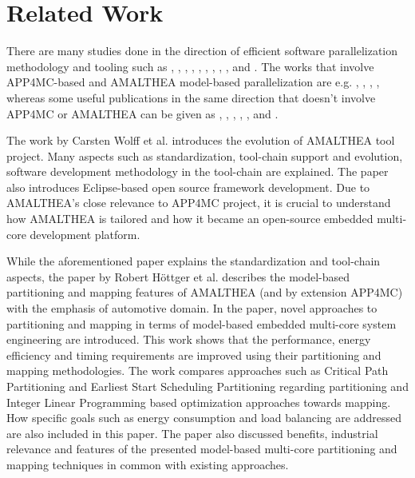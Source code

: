 

\section{Related Work}
There are many studies done in the direction of efficient software parallelization methodology and tooling such as \cite{toolchaintailoringapp4mc}, \cite{priorpaperapp4mc}, \cite{comparisonpaperapp4mc}, \cite{constrainedpaper}, \cite{autosarospaper1}, \cite{paper2}, \cite{paper3}, \cite{paper4}, \cite{paper5}, and \cite{paper6}.
The works that involve APP4MC-based and AMALTHEA model-based parallelization are e.g. \cite{toolchaintailoringapp4mc}, \cite{priorpaperapp4mc}, \cite{comparisonpaperapp4mc}, \cite{constrainedpaper}, whereas some useful publications in the same direction that doesn't involve APP4MC or AMALTHEA can be given as \cite{autosarospaper1}, \cite{paper2}, \cite{paper3}, \cite{paper4}, \cite{paper5}, and \cite{paper6}.

The work by Carsten Wolff et al. \cite{toolchaintailoringapp4mc} introduces the evolution of AMALTHEA tool project. Many aspects such as standardization, tool-chain support and evolution, software development methodology in the tool-chain are explained. The paper also introduces Eclipse-based open source framework development. Due to AMALTHEA's close relevance to APP4MC project, it is crucial to understand how AMALTHEA is tailored and how it became an open-source embedded multi-core development platform. 

While the aforementioned paper explains the standardization and tool-chain aspects, the paper by Robert H{\"o}ttger et al. \cite{priorpaperapp4mc} describes the model-based partitioning and mapping features of AMALTHEA (and by extension APP4MC) with the emphasis of automotive domain. In the paper, novel approaches to partitioning and mapping in terms of model-based embedded multi-core system engineering are introduced. This work shows that the performance, energy efficiency and timing requirements are improved using their partitioning and mapping methodologies. The work compares approaches such as Critical Path Partitioning and Earliest Start Scheduling Partitioning regarding partitioning and Integer Linear Programming based optimization approaches towards mapping. How specific goals such as energy consumption and load balancing are addressed are also included in this paper. The paper also discussed benefits, industrial relevance and features of the presented model-based multi-core partitioning and mapping techniques in common with existing approaches.

